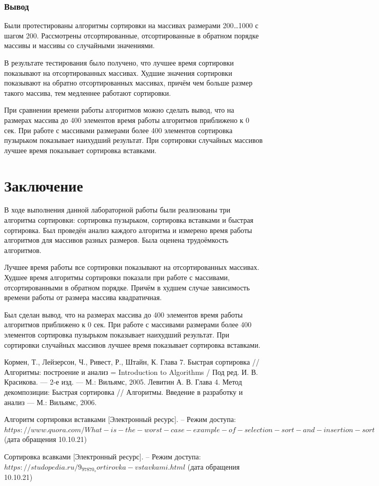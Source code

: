 \documentclass[12pt]{report}
\begin{document}
\subsection{Вывод}
Были протестированы алгоритмы сортировки на массивах размерами 200…1000 с шагом 200. Рассмотрены отсортированные, отсортированные в обратном порядке массивы и массивы со случайными значениями.

В результате тестирования было получено, что лучшее время сортировки показывают на отсортированных массивах. Худшие значения сортировки показывают на обратно отсортированных массивах, причём чем больше размер такого массива, тем медленнее работают сортировки. 

При сравнении времени работы алгоритмов можно сделать вывод, что на размерах массива до 400 элементов время работы алгоритмов приближено к 0 сек. При работе с массивами размерами более 400 элементов сортировка пузырьком показывает наихудший результат. При сортировки случайных массивов лучшее время показывает сортировка вставками.

\chapter*{Заключение}
В ходе выполнения данной лабораторной работы были реализованы три алгоритма сортировки: сортировка пузырьком, сортировка вставками и быстрая сортировка. Был проведён анализ каждого алгоритма и измерено время работы алгоритмов для массивов разных размеров. Была оценена трудоёмкость алгоритмов.

Лучшее время работы все сортировки показывают на отсортированных массивах. Худшее время алгоритмы сортировки показали при работе с массивами, отсортированными в обратном порядке. Причём в худшем случае зависимость времени работы от размера массива квадратичная.

Был сделан вывод, что на размерах массива до 400 элементов время работы алгоритмов приближено к 0 сек. При работе с массивами размерами более 400 элементов сортировка пузырьком показывает наихудший результат. При сортировки случайных массивов лучшее время показывает сортировка вставками.


\begin{thebibliography}{4}
	  Кормен, Т., Лейзерсон, Ч., Ривест, Р., Штайн, К. Глава 7. Быстрая сортировка // Алгоритмы: построение и анализ = Introduction to Algorithms / Под ред. И. В. Красикова. — 2-е изд. — М.: Вильямс, 2005.
     Левитин А. В. Глава 4. Метод декомпозиции: Быстрая сортировка // Алгоритмы. Введение в разработку и анализ — М.: Вильямс, 2006.
    
     Алгоритм сортировки вставками $[$Электронный ресурс$]$. – Режим доступа:$https://www.quora.com/What-is-the-worst-case-example-of-selection-sort-and-insertion-sort$ (дата обращения 10.10.21)
    
     Сортировка всавками $[$Электронный ресурс$]$. – Режим доступа:$https://studopedia.ru/9_97870_sortirovka-vstavkami.html$ (дата обращения 10.10.21)
    
\end{thebibliography}
\end{document}
